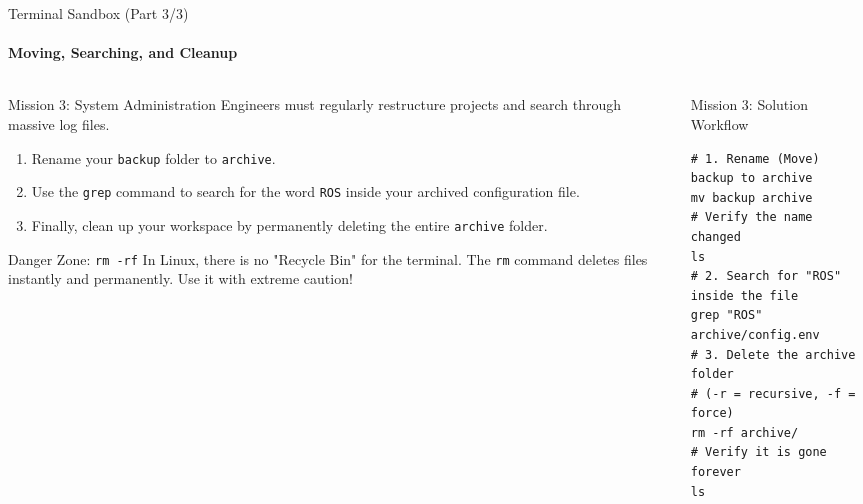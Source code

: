 \begin{frame}[fragile]{Terminal Sandbox (Part 3/3)}
\framesubtitle{Moving, Searching, and Cleanup}

\footnotesize

\begin{columns}[T,onlytextwidth]

    \begin{column}{0.48\textwidth}
        \begin{exampleblock}{Mission 3: System Administration}
            Engineers must regularly restructure projects and search through massive log files.
            \begin{enumerate}
                \setlength{\itemsep}{0.2em}
                \item Rename your \texttt{backup} folder to \texttt{archive}.
                \item Use the \texttt{grep} command to search for the word \texttt{ROS} inside your archived configuration file.
                \item Finally, clean up your workspace by permanently deleting the entire \texttt{archive} folder.
            \end{enumerate}
        \end{exampleblock}
        
        \begin{alertblock}{Danger Zone: \texttt{rm -rf}}
            In Linux, there is no "Recycle Bin" for the terminal. The \texttt{rm} command deletes files instantly and permanently. Use it with extreme caution!
        \end{alertblock}
    \end{column}

    \pause
    \begin{column}{0.48\textwidth}
        \begin{block}{Mission 3: Solution Workflow}
            
\begin{verbatim}
# 1. Rename (Move) backup to archive
mv backup archive
# Verify the name changed
ls
# 2. Search for "ROS" inside the file
grep "ROS" archive/config.env
# 3. Delete the archive folder 
# (-r = recursive, -f = force)
rm -rf archive/
# Verify it is gone forever
ls
\end{verbatim}
        \end{block}
    \end{column}

\end{columns}
\end{frame}



